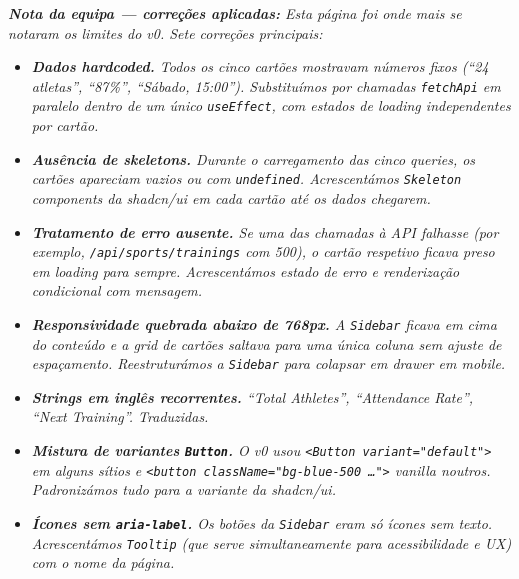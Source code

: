 
\noindent\textit{\textbf{Nota da equipa --- correções aplicadas:} Esta página foi onde mais se notaram os limites do v0. Sete correções principais:}
\begin{itemize}
    \item \textit{\textbf{Dados \textit{hardcoded}.} Todos os cinco cartões mostravam números fixos (``24 atletas'', ``87\%'', ``Sábado, 15:00''). Substituímos por chamadas \texttt{fetchApi} em paralelo dentro de um único \texttt{useEffect}, com estados de \textit{loading} independentes por cartão.}
    \item \textit{\textbf{Ausência de \textit{skeletons}.} Durante o carregamento das cinco \textit{queries}, os cartões apareciam vazios ou com \texttt{undefined}. Acrescentámos \texttt{Skeleton} components da shadcn/ui em cada cartão até os dados chegarem.}
    \item \textit{\textbf{Tratamento de erro ausente.} Se uma das chamadas à API falhasse (por exemplo, \texttt{/api/sports/trainings} com 500), o cartão respetivo ficava preso em \textit{loading} para sempre. Acrescentámos estado de erro e renderização condicional com mensagem.}
    \item \textit{\textbf{Responsividade quebrada abaixo de 768px.} A \texttt{Sidebar} ficava em cima do conteúdo e a \textit{grid} de cartões saltava para uma única coluna sem ajuste de espaçamento. Reestruturámos a \texttt{Sidebar} para colapsar em \textit{drawer} em \textit{mobile}.}
    \item \textit{\textbf{Strings em inglês recorrentes.} ``Total Athletes'', ``Attendance Rate'', ``Next Training''. Traduzidas.}
    \item \textit{\textbf{Mistura de variantes \texttt{Button}.} O v0 usou \texttt{<Button variant="default">} em alguns sítios e \texttt{<button className="bg-blue-500 \ldots">} \textit{vanilla} noutros. Padronizámos tudo para a variante da shadcn/ui.}
    \item \textit{\textbf{Ícones sem \texttt{aria-label}.} Os botões da \texttt{Sidebar} eram só ícones sem texto. Acrescentámos \texttt{Tooltip} (que serve simultaneamente para acessibilidade e UX) com o nome da página.}
\end{itemize}


